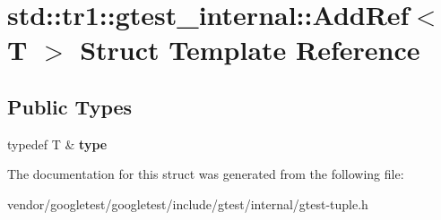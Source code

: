 \hypertarget{structstd_1_1tr1_1_1gtest__internal_1_1_add_ref}{}\section{std\+:\+:tr1\+:\+:gtest\+\_\+internal\+:\+:Add\+Ref$<$ T $>$ Struct Template Reference}
\label{structstd_1_1tr1_1_1gtest__internal_1_1_add_ref}
\subsection*{Public Types}
\begin{DoxyCompactItemize}
\item 
\mbox{\label{structstd_1_1tr1_1_1gtest__internal_1_1_add_ref_a1e5616e414125574c1653e3a1fc68491}} 
typedef T \& {\bfseries type}
\end{DoxyCompactItemize}


The documentation for this struct was generated from the following file\+:\begin{DoxyCompactItemize}
\item 
vendor/googletest/googletest/include/gtest/internal/gtest-\/tuple.\+h\end{DoxyCompactItemize}

